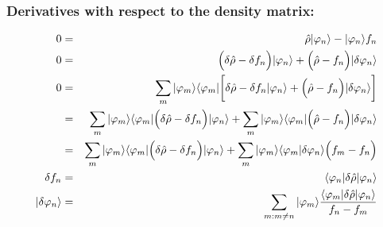 \documentclass[11pt,a4paper]{report}
\begin{document}
\subsubsection{Derivatives with respect to the density matrix:}

\begin{eqnarray}
0&=&\hat{\rho}|\varphi_n\rangle-|\varphi_n\rangle f_n
\nonumber\\
0&=&\Bigl(\delta\hat{\rho}-\delta{f}_n\Bigr)|\varphi_n\rangle
+
\Bigl(\hat{\rho}-f_n\Bigr)|\delta\varphi_n\rangle 
\nonumber\\
0&=&\sum_m|\varphi_m\rangle\langle\varphi_m|
\biggl[
\delta\hat{\rho}-\delta{f}_n|\varphi_n\rangle
+\Bigl(\hat{\rho}-f_n\Bigr)|\delta\varphi_n\rangle 
\biggr]
\nonumber\\
%
&=&\sum_m|\varphi_m\rangle
\langle\varphi_m|
\Bigl(\delta\hat{\rho}-\delta{f}_n\Bigr)|\varphi_n\rangle
+
\sum_m|\varphi_m\rangle\langle\varphi_m|
\Bigl(\hat{\rho}-f_n\Bigr)|\delta\varphi_n\rangle 
\nonumber\\
%
%
&=&\sum_m|\varphi_m\rangle
\langle\varphi_m|
\Bigl(\delta\hat{\rho}-\delta{f}_n\Bigr)|\varphi_n\rangle
+
\sum_m|\varphi_m\rangle\langle\varphi_m|\delta\varphi_n\rangle 
\Big(f_m-f_n\Bigr)
\nonumber\\
\delta{f}_n&=&\langle\varphi_n|\delta\hat{\rho}|\varphi_n\rangle
\nonumber\\
|\delta\varphi_n\rangle&=&\sum_{m:m\neq n}
|\varphi_m\rangle
\frac{\langle\varphi_m|\delta\hat{\rho}|\varphi_n\rangle}{f_n-f_m}
\end{eqnarray}
\end{document}
